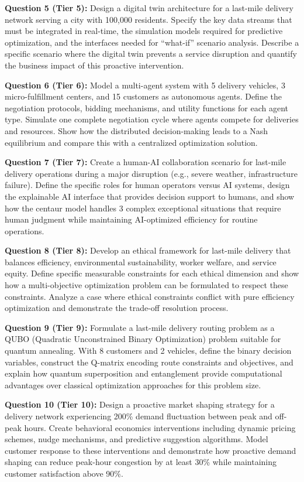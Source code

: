 \documentclass{article}
\begin{document}
\textbf{Question 5 (Tier 5):} Design a digital twin architecture for a last-mile delivery network serving a city with 100,000 residents. Specify the key data streams that must be integrated in real-time, the simulation models required for predictive optimization, and the interfaces needed for ``what-if'' scenario analysis. Describe a specific scenario where the digital twin prevents a service disruption and quantify the business impact of this proactive intervention.

\textbf{Question 6 (Tier 6):} Model a multi-agent system with 5 delivery vehicles, 3 micro-fulfillment centers, and 15 customers as autonomous agents. Define the negotiation protocols, bidding mechanisms, and utility functions for each agent type. Simulate one complete negotiation cycle where agents compete for deliveries and resources. Show how the distributed decision-making leads to a Nash equilibrium and compare this with a centralized optimization solution.

\textbf{Question 7 (Tier 7):} Create a human-AI collaboration scenario for last-mile delivery operations during a major disruption (e.g., severe weather, infrastructure failure). Define the specific roles for human operators versus AI systems, design the explainable AI interface that provides decision support to humans, and show how the centaur model handles 3 complex exceptional situations that require human judgment while maintaining AI-optimized efficiency for routine operations.

\textbf{Question 8 (Tier 8):} Develop an ethical framework for last-mile delivery that balances efficiency, environmental sustainability, worker welfare, and service equity. Define specific measurable constraints for each ethical dimension and show how a multi-objective optimization problem can be formulated to respect these constraints. Analyze a case where ethical constraints conflict with pure efficiency optimization and demonstrate the trade-off resolution process.

\textbf{Question 9 (Tier 9):} Formulate a last-mile delivery routing problem as a QUBO (Quadratic Unconstrained Binary Optimization) problem suitable for quantum annealing. With 8 customers and 2 vehicles, define the binary decision variables, construct the Q-matrix encoding route constraints and objectives, and explain how quantum superposition and entanglement provide computational advantages over classical optimization approaches for this problem size.

\textbf{Question 10 (Tier 10):} Design a proactive market shaping strategy for a delivery network experiencing 200\% demand fluctuation between peak and off-peak hours. Create behavioral economics interventions including dynamic pricing schemes, nudge mechanisms, and predictive suggestion algorithms. Model customer response to these interventions and demonstrate how proactive demand shaping can reduce peak-hour congestion by at least 30\% while maintaining customer satisfaction above 90\%.
\end{document}
